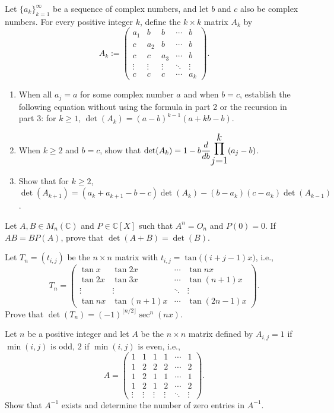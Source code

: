\documentclass[12pt]{article}
\let\oldprod\prod
\renewcommand{\prod}{\mathlarger{\mathlarger{\oldprod}}}
\begin{document}
\begin{problem}
Let $\{a_k\}_{k=1}^\infty$ be a sequence of complex numbers, and let $b$ and $c$ also be complex numbers. For every positive integer $k$, define the $k\times k$ matrix $A_k$ by
\[
A_k := \begin{pmatrix}
a_1 & b & b & \cdots & b\\
c & a_2 & b & \cdots & b\\
c & c & a_3 & \cdots & b\\
\vdots & \vdots & \vdots & \ddots & \vdots\\
c & c & c & \cdots & a_k
\end{pmatrix}.
\]
\begin{enumerate}[label=\arabic*.]
\item When all $a_j=a$ for some complex number $a$ and when $b=c$, establish the following equation without using the formula in part 2 or the recursion in part 3: for $k\ge 1$, $\det(A_k) = (a-b)^{k-1}(a+kb-b)$.
\item When $k\ge 2$ and $b=c$, show that $\det(A_k) = 1 - b\dfrac{d}{db}\displaystyle\prod_{j=1}^k (a_j-b)$.
\item Show that for $k\ge 2$, $\det(A_{k+1}) = (a_k+a_{k+1}-b-c)\det(A_k) - (b-a_k)(c-a_k)\det(A_{k-1})$.
\end{enumerate}
\end{problem}

\begin{problem}
Let $A,B\in M_n(\mathbb{C})$ and $P\in\mathbb{C}[X]$ such that $A^n=O_n$ and $P(0)=0$. If $AB=BP(A)$, prove that $\det(A+B)=\det(B)$.
\end{problem}

\begin{problem}
Let $T_n=(t_{i,j})$ be the $n\times n$ matrix with $t_{i,j}=\tan\big((i+j-1)x\big)$, i.e.,
\[
T_n = \begin{pmatrix}
\tan x & \tan 2x & \cdots & \tan nx\\
\tan 2x & \tan 3x & \cdots & \tan(n+1)x\\
\vdots & \vdots & \ddots & \vdots\\
\tan nx & \tan(n+1)x & \cdots & \tan(2n-1)x
\end{pmatrix}.
\]
Prove that $\det(T_n) = (-1)^{\lfloor n/2\rfloor}\sec^n(nx)$.
\end{problem}

\begin{problem}
Let $n$ be a positive integer and let $A$ be the $n\times n$ matrix defined by $A_{i,j}=1$ if $\min(i,j)$ is odd, $2$ if $\min(i,j)$ is even, i.e.,
\[
A = \begin{pmatrix}
1 & 1 & 1 & 1 & \cdots & 1\\
1 & 2 & 2 & 2 & \cdots & 2\\
1 & 2 & 1 & 1 & \cdots & 1\\
1 & 2 & 1 & 2 & \cdots & 2\\
\vdots & \vdots & \vdots & \vdots & \ddots & \vdots
\end{pmatrix}.
\]
Show that $A^{-1}$ exists and determine the number of zero entries in $A^{-1}$.
\end{problem}
\end{document}
